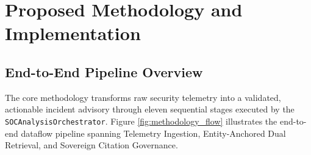\chapter{Proposed Methodology and Implementation}
\label{ch:implementation}

\section{End-to-End Pipeline Overview}
\label{sec:impl_pipeline}

The core methodology transforms raw security telemetry into a validated, actionable incident advisory through eleven sequential stages executed by the \texttt{SOCAnalysisOrchestrator}. Figure \ref{fig:methodology_flow} illustrates the end-to-end dataflow pipeline spanning Telemetry Ingestion, Entity-Anchored Dual Retrieval, and Sovereign Citation Governance.

